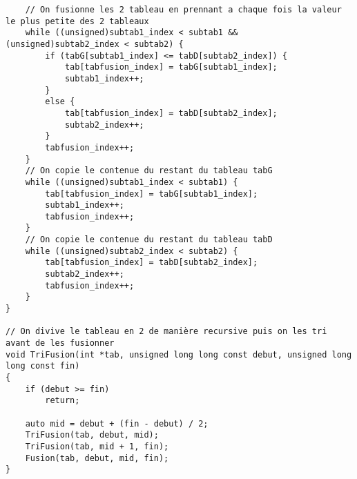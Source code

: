 \begin{verbatim}
    // On fusionne les 2 tableau en prennant a chaque fois la valeur le plus petite des 2 tableaux
    while ((unsigned)subtab1_index < subtab1 && (unsigned)subtab2_index < subtab2) {
        if (tabG[subtab1_index] <= tabD[subtab2_index]) {
            tab[tabfusion_index] = tabG[subtab1_index];
            subtab1_index++;
        }
        else {
            tab[tabfusion_index] = tabD[subtab2_index];
            subtab2_index++;
        }
        tabfusion_index++;
    }
    // On copie le contenue du restant du tableau tabG
    while ((unsigned)subtab1_index < subtab1) {
        tab[tabfusion_index] = tabG[subtab1_index];
        subtab1_index++;
        tabfusion_index++;
    }
    // On copie le contenue du restant du tableau tabD
    while ((unsigned)subtab2_index < subtab2) {
        tab[tabfusion_index] = tabD[subtab2_index];
        subtab2_index++;
        tabfusion_index++;
    }
}

// On divive le tableau en 2 de manière recursive puis on les tri avant de les fusionner
void TriFusion(int *tab, unsigned long long const debut, unsigned long long const fin)
{
    if (debut >= fin)
        return;

    auto mid = debut + (fin - debut) / 2;
    TriFusion(tab, debut, mid);
    TriFusion(tab, mid + 1, fin);
    Fusion(tab, debut, mid, fin);
}

\end{verbatim}

